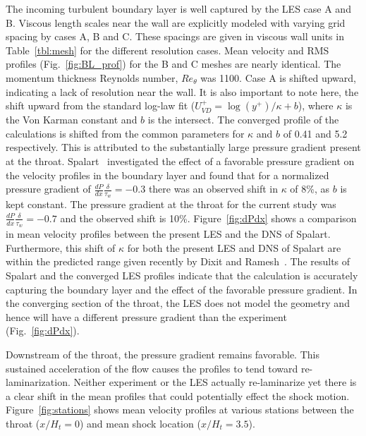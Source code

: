 \documentclass[]{aiaa-tc}%
\begin{document}
The incoming turbulent boundary layer is well captured by the LES case A and B.  Viscous length scales near the wall are explicitly modeled with varying grid spacing by cases A, B and C.  These spacings are given in viscous wall units in Table~\ref{tbl:mesh} for the different resolution cases.  Mean velocity and RMS profiles (Fig.~\ref{fig:BL_prof}) for the B and C meshes are nearly identical.  The momentum thickness Reynolds number, $Re_\theta$ was 1100.  Case A is shifted upward, indicating a lack of resolution near the wall.  It is also important to note here, the shift upward from the standard log-law fit ($U_{VD}^+ = \log(y^+) / \kappa+ b $), where $\kappa$ is the Von Karman constant and $b$ is the intersect.  The converged profile of the calculations is shifted from the common parameters for $\kappa$ and $b$ of 0.41 and 5.2 respectively.  This is attributed to the substantially large pressure gradient present at the throat.  Spalart~\cite{Spalart:93} investigated the effect of a favorable pressure gradient on the velocity profiles in the boundary layer and found that for a normalized pressure gradient of $\frac{dP}{dx}\frac{\delta}{\tau_w} = -0.3$ there was an observed shift in $\kappa$ of 8\%, as $b$ is kept constant.  The pressure gradient at the throat for the current study was $\frac{dP}{dx}\frac{\delta}{\tau_w} = -0.7$ and the observed shift is 10\%.  Figure~\ref{fig:dPdx} shows a comparison in mean velocity profiles between the present LES and the DNS of Spalart.  Furthermore, this shift of $\kappa$ for both the present LES and DNS of Spalart are within the predicted range given recently by Dixit and Ramesh~\cite{Dixit:08}.  The results of Spalart and the converged LES profiles indicate that the calculation is accurately capturing the boundary layer and the effect of the favorable pressure gradient.  In the converging section of the throat, the LES does not model the geometry and hence will have a different pressure gradient than the experiment (Fig.~\ref{fig:dPdx}).





Downstream of the throat, the pressure gradient remains favorable.  This sustained acceleration of the flow causes the profiles to tend toward re-laminarization.  Neither experiment or the LES actually re-laminarize yet there is a clear shift in the mean profiles that could potentially effect the shock motion.  Figure~\ref{fig:stations} shows mean velocity profiles at various stations between the throat ($x/H_t=0$) and mean shock location ($x/H_t=3.5$).
\end{document}
